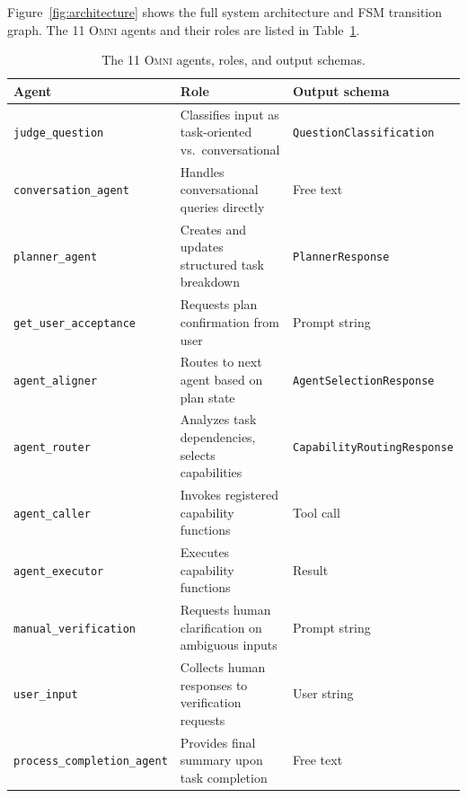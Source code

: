 \documentclass[11pt,a4paper]{article}
\newcommand{\omni}{\textsc{Omni}}
\begin{document}
Figure~\ref{fig:architecture} shows the full system architecture and FSM transition graph. The 11 \omni{} agents and their roles are listed in Table~\ref{tab:agents}.

\begin{table}[h]
\centering
\caption{The 11 \omni{} agents, roles, and output schemas.}
\label{tab:agents}
\small
\begin{tabular}{lll}
\toprule
\textbf{Agent} & \textbf{Role} & \textbf{Output schema} \\
\midrule
\texttt{judge\_question} & Classifies input as task-oriented vs.\ conversational & \texttt{QuestionClassification} \\
\texttt{conversation\_agent} & Handles conversational queries directly & Free text \\
\texttt{planner\_agent} & Creates and updates structured task breakdown & \texttt{PlannerResponse} \\
\texttt{get\_user\_acceptance} & Requests plan confirmation from user & Prompt string \\
\texttt{agent\_aligner} & Routes to next agent based on plan state & \texttt{AgentSelectionResponse} \\
\texttt{agent\_router} & Analyzes task dependencies, selects capabilities & \texttt{CapabilityRoutingResponse} \\
\texttt{agent\_caller} & Invokes registered capability functions & Tool call \\
\texttt{agent\_executor} & Executes capability functions & Result \\
\texttt{manual\_verification} & Requests human clarification on ambiguous inputs & Prompt string \\
\texttt{user\_input} & Collects human responses to verification requests & User string \\
\texttt{process\_completion\_agent} & Provides final summary upon task completion & Free text \\
\bottomrule
\end{tabular}
\end{table}
\end{document}
